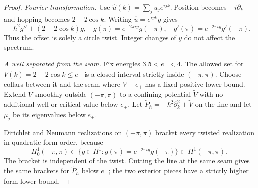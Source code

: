 \begin{proof}
\emph{Fourier transformation.} Use $\widehat u(k)=\sum_ju_je^{ijk}$. Position becomes $-i\partial_k$ and hopping becomes $2-2\cos k$. Writing $\widehat u=e^{iyk}g$ gives
\begin{equation}\label{eq:circleMathieu}
 -\hbar^2g''+(2-2\cos k)g,
 \quad g(\pi)=e^{-2\pi iy}g(-\pi),\quad
 g'(\pi)=e^{-2\pi iy}g'(-\pi).
\end{equation}
Thus the offset is solely a circle twist. Integer changes of $y$ do not affect the spectrum.

\emph{A well separated from the seam.} Fix energies $3.5<e_+<4$. The allowed set for $V(k)=2-2\cos k\le e_+$ is a closed interval strictly inside $(-\pi,\pi)$. Choose collars between it and the seam where $V-e_+$ has a fixed positive lower bound. Extend $V$ smoothly outside $(-\pi,\pi)$ to a confining potential $\widetilde V$ with no additional well or critical value below $e_+$. Let $\widetilde P_\hbar=-\hbar^2\partial_k^2+\widetilde V$ on the line and let $\mu_j$ be its eigenvalues below $e_+$.

Dirichlet and Neumann realizations on $(-\pi,\pi)$ bracket every twisted realization in quadratic-form order, because
\[
 H_0^1(-\pi,\pi)\subset
 \{g\in H^1:g(\pi)=e^{-2\pi iy}g(-\pi)\}
 \subset H^1(-\pi,\pi).
\]
The bracket is independent of the twist. Cutting the line at the same seam gives the same brackets for $\widetilde P_\hbar$ below $e_+$; the two exterior pieces have a strictly higher form lower bound.


\end{proof}
